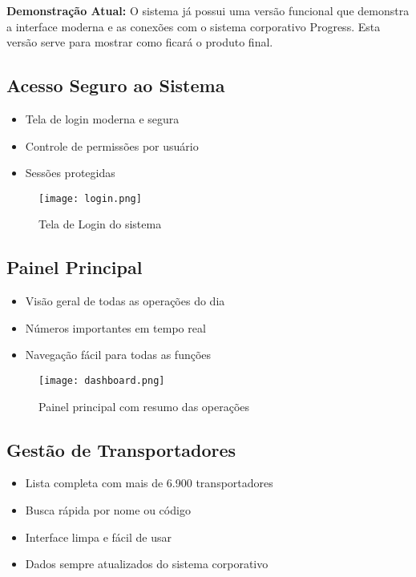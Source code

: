 \documentclass[12pt,a4paper]{article}
\begin{document}
\textbf{Demonstração Atual:} O sistema já possui uma versão funcional que demonstra a interface moderna e as conexões com o sistema corporativo Progress. Esta versão serve para mostrar como ficará o produto final.

\subsection{Acesso Seguro ao Sistema}
\begin{itemize}
    \item Tela de login moderna e segura
    \item Controle de permissões por usuário
    \item Sessões protegidas
\end{itemize}

\begin{figure}[H]
    \centering
    \vspace{1cm} %
    \texttt{[image: login.png]}
    \vspace{1cm} %
    \caption{Tela de Login do sistema}
\end{figure}


\subsection{Painel Principal}
\begin{itemize}
    \item Visão geral de todas as operações do dia
    \item Números importantes em tempo real
    \item Navegação fácil para todas as funções
\end{itemize}

\begin{figure}[H]
    \centering
    \vspace{1cm} %
    \texttt{[image: dashboard.png]}
    \vspace{1cm} %
    \caption{Painel principal com resumo das operações}
\end{figure}

\subsection{Gestão de Transportadores}
\begin{itemize}
    \item Lista completa com mais de 6.900 transportadores
    \item Busca rápida por nome ou código
    \item Interface limpa e fácil de usar
    \item Dados sempre atualizados do sistema corporativo
\end{itemize}
\end{document}
